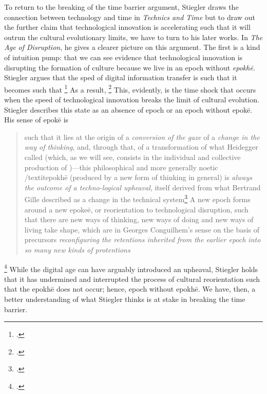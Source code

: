 \documentclass[letterpaper,notitlepage,12pt]{article}
\begin{document}
To return to the breaking of the time barrier argument, Stiegler draws the
connection between technology and time in \textit{Technics and Time} but to draw
out the further claim that technological innovation is accelerating such that it
will outrun the cultural evolutionary limits, we have to turn to his later
works.
In \textit{The Age of Disruption}, he gives a clearer picture on this argument.
The first is a kind of intuition pump: that we can see evidence that
technological innovation is disrupting the formation of culture because we live
in an epoch without \textit{epokh\={e}}. Stiegler argues that the sped of
digital information transfer is such that it becomes  such that \footcite[ch. 1.4]{stiegler_age_2010}
As a result, \footcite[ch. 1.5]{stiegler_age_2019}
This, evidently, is the time shock that occurs when the speed of technological
innovation breaks the limit of cultural evolution.
Stiegler describes this state as an absence of epoch or an epoch without
epok\={e}.
His sense of epok\={e} is \blockquote{such that it lies at the origin of a
  \textit{conversion of the gaze} of a \textit{change in the way of thinking},
  and, through that, of a transformation of what Heidegger called
   (which, as we will see, consists in the individual and collective
  production of )---this philosophical
  and more generally noetic /textit{epokh\={e} (produced by a new form of
    thinking in general) is \textit{always the outcome of a techno-logical
    upheaval}, itself derived from what Bertrand Gille described as a change in
  the technical system}\footcite[ch. 2.7]{stiegler_age_2019}
  A new epoch forms around a new epoke\={e}, or reorientation to technological
  disruption, such that there are new ways of thinking, new ways of
    doing and new ways of living take shape, which are  in Georges Conguilhem's sense on the basis of precursors
    \textit{reconfiguring the retentions inherited from the earlier epoch into
  so many new kinds of protentions}}\footcite[ch. 2.8]{stiegler_age_2019}
While the digital age can have arguably introduced an upheaval, Stiegler holds
that it has undermined and interrupted the process of cultural reorientation
such that the epokh\={e} does not occur; hence, epoch without epokh\={e}.
We have, then, a better understanding of what Stiegler thinks is at stake in
breaking the time barrier.
\end{document}
